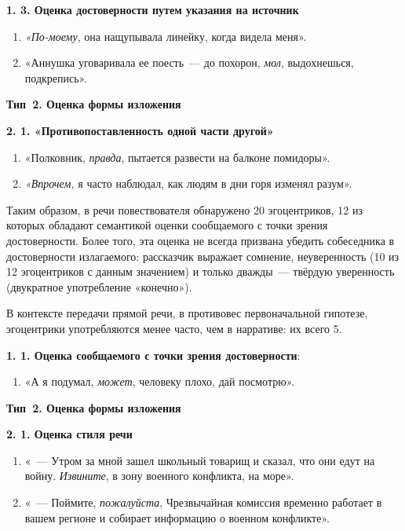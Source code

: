 \documentclass{kursa4}
\begin{document}
      \textbf{1. 3. Оценка достоверности путем указания на источник}
        \setcounter{saveenum}{\value{enumi}}
        \begin{enumerate}
        \setcounter{enumi}{\value{saveenum}}
        \item \textit{«По-моему}, она нащупывала линейку, когда видела меня». \item «Аннушка уговаривала ее поесть~--- до похорон, \textit{мол}, выдохнешься, подкрепись». \end{enumerate}

      {\centering
      \textbf{Тип~2. Оценка формы изложения}
      \par}

      \textbf{2. 1. «Противопоставленность одной части другой»}
        \setcounter{saveenum}{\value{enumi}}
        \begin{enumerate}
        \setcounter{enumi}{\value{saveenum}}
        \item «Полковник, \textit{правда}, пытается развести на балконе помидоры». \item \textit{«Впрочем,} я часто наблюдал, как людям в дни горя изменял разум». \end{enumerate}

      Таким образом, в речи повествователя обнаружено 20 эгоцентриков, 12 из которых обладают семантикой оценки сообщаемого с точки зрения достоверности. Более того, эта оценка не всегда призвана убедить собеседника в достоверности излагаемого: рассказчик выражает сомнение, неуверенность (10 из 12 эгоцентриков с данным значением) и только дважды~--- твёрдую уверенность (двукратное употребление «конечно»). 

      В контексте передачи прямой речи, в противовес первоначальной гипотезе, эгоцентрики употребляются менее часто, чем в нарративе: их всего 5. 

      {\par}

      \textbf{1. 1. Оценка сообщаемого с точки зрения достоверности}: \begin{enumerate}
        \item «А я подумал, \textit{может}, человеку плохо, дай посмотрю». \end{enumerate}

      {\centering
      \textbf{Тип~2. Оценка формы изложения }
      \par}

      \textbf{2. 1. Оценка стиля речи}
        \setcounter{saveenum}{\value{enumi}}
        \begin{enumerate}
        \setcounter{enumi}{\value{saveenum}}
        \item «~--- Утром за мной зашел школьный товарищ и сказал, что они едут на войну. \textit{Извините}, в зону военного конфликта, на море». 
        \item «~--- Поймите, \textit{пожалуйста}, Чрезвычайная комиссия временно работает в вашем регионе и собирает информацию о военном конфликте». \end{enumerate}
\end{document}
